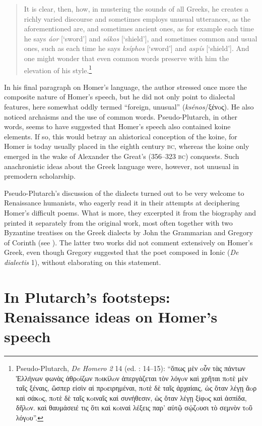 \begin{quote}
It is clear, then, how, in mustering the sounds of all Greeks, he creates a richly varied discourse and sometimes employs unusual utterances, as the aforementioned are, and sometimes ancient ones, as for example each time he says \textit{áor} [‘sword’] and \textit{sákos} [‘shield’], and sometimes common and usual ones, such as each time he says \textit{ksíphos} [‘sword’] and \textit{aspís} [‘shield’]. And one might wonder that even common words preserve with him the elevation of his style.\footnote{Pseudo-Plutarch, \textit{De Homero 2} 14 (ed. \citealt{Kindstrand1990}: 14–15): “ὅπως μὲν oὖν τὰς πάντων Ἑλλήνων φωνὰς ἀθρoίζων πoικίλoν ἀπεργάζεται τὸν λόγoν καὶ χρῆται πoτὲ μὲν ταῖς ξέναις, ὥσπερ εἰσὶν αἱ πρoειρημέναι, πoτὲ δὲ ταῖς ἀρχαίαις, ὡς ὅταν λέγῃ ἄoρ καὶ σάκoς, πoτὲ δὲ ταῖς κoιναῖς καὶ συνήθεσιν, ὡς ὅταν λέγῃ ξίφoς καὶ ἀσπίδα, δῆλoν. καὶ θαυμάσειέ τις ὅτι καὶ κoιναὶ λέξεις παρ’ αὐτῷ σῴζoυσι τὸ σεμνὸν τoῦ λόγoυ”.}
\end{quote}

In his final paragraph on Homer’s language, the author stressed once more the composite nature of Homer’s speech, but he did not only point to dialectal features, here somewhat oddly termed “foreign, unusual” (\textit{ksénos}/ξένoς). He also noticed archaisms and the use of common words. Pseudo-Plutarch, in other words, seems to have suggested that Homer’s speech also contained koine elements. If so, this would betray an ahistorical conception of the koine, for Homer is today usually placed in the eighth century \textsc{bc}, whereas the koine only emerged in the wake of Alexander the Great’s (356–323 \textsc{bc}) conquests. Such anachronistic ideas about the Greek language were, however, not unusual in premodern scholarship.

Pseudo-Plutarch’s discussion of the dialects turned out to be very welcome to Renaissance humanists, who eagerly read it in their attempts at deciphering Homer’s difficult poems. What is more, they excerpted it from the biography and printed it separately from the original work, most often together with two Byzantine treatises on the Greek dialects by John the Grammarian and Gregory of Corinth (see \citealt{VanRooy2018c}). The latter two works did not comment extensively on Homer’s Greek, even though Gregory suggested that the poet composed in Ionic (\textit{De dialectis} 1), without elaborating on this statement.

\section{In Plutarch’s footsteps: Renaissance ideas on Homer’s speech}\label{sec:4.2}

